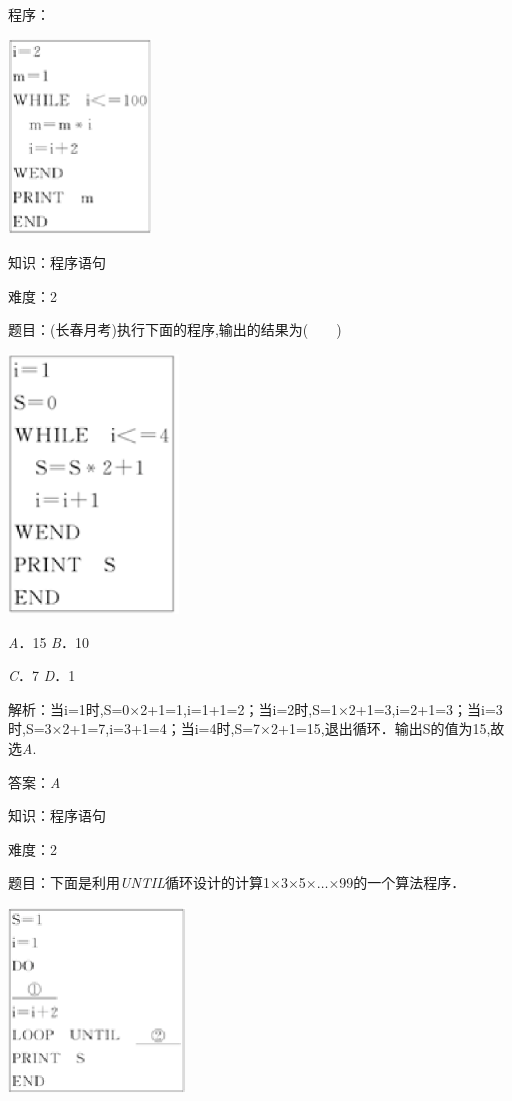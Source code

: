 \documentclass{article} %
\begin{document}
程序：

\includegraphics*[width=1.51in, height=2.04in, keepaspectratio=false]{image69}

知识：程序语句

难度：2

题目：(长春月考)执行下面的程序,输出的结果为(　　)

\includegraphics*[width=1.78in, height=2.71in, keepaspectratio=false]{image70}

\textit{A}．15  \textit{B}．10

\textit{C}．7   \textit{D}．1

解析：当i=1时,S=0$\mathrm{\times}$2+1=1,i=1+1=2；当i=2时,S=1$\mathrm{\times}$2+1=3,i=2+1=3；当i=3时,S=3$\mathrm{\times}$2+1=7,i=3+1=4；当i=4时,S=7$\mathrm{\times}$2+1=15,退出循环．输出S的值为15,故选\textit{A}.

答案：\textit{A}

知识：程序语句

难度：2

题目：下面是利用\textit{UNTIL}循环设计的计算1$\mathrm{\times}$3$\mathrm{\times}$5$\mathrm{\times}$$\dots$$\mathrm{\times}$99的一个算法程序．

\includegraphics*[width=1.85in, height=1.95in, keepaspectratio=false]{image71}
\end{document}
